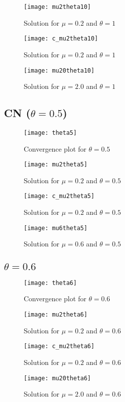 \documentclass{article}
\begin{document}
\begin{figure}[h!]
    \centering
    \texttt{[image: mu2theta10]}
    \caption{Solution for $\mu=0.2$ and $\theta=1$}
\end{figure}
\begin{figure}[h!]
    \centering
    \texttt{[image: c\_mu2theta10]}
    \caption{Solution for $\mu=0.2$ and $\theta=1$}
\end{figure}
\begin{figure}[h!]
    \centering
    \texttt{[image: mu20theta10]}
    \caption{Solution for $\mu=2.0$ and $\theta=1$}
\end{figure}

\clearpage
\subsection{CN ($\theta = 0.5$)}
\begin{figure}[h!]
    \centering
    \texttt{[image: theta5]}
    \caption{Convergence plot for $\theta=0.5$}
\end{figure}

\begin{figure}[h!]
    \centering
    \texttt{[image: mu2theta5]}
    \caption{Solution for $\mu=0.2$ and $\theta=0.5$}
\end{figure}
\begin{figure}[h!]
    \centering
    \texttt{[image: c\_mu2theta5]}
    \caption{Solution for $\mu=0.2$ and $\theta=0.5$}
\end{figure}
\begin{figure}[h!]
    \centering
    \texttt{[image: mu6theta5]}
    \caption{Solution for $\mu=0.6$ and $\theta=0.5$}
\end{figure}

\clearpage
\subsection{$\theta = 0.6$}
\begin{figure}[h!]
    \centering
    \texttt{[image: theta6]}
    \caption{Convergence plot for $\theta=0.6$}
\end{figure}

\begin{figure}[h!]
    \centering
    \texttt{[image: mu2theta6]}
    \caption{Solution for $\mu=0.2$ and $\theta=0.6$}
\end{figure}
\begin{figure}[h!]
    \centering
    \texttt{[image: c\_mu2theta6]}
    \caption{Solution for $\mu=0.2$ and $\theta=0.6$}
\end{figure}
\begin{figure}[h!]
    \centering
    \texttt{[image: mu20theta6]}
    \caption{Solution for $\mu=2.0$ and $\theta=0.6$}
\end{figure}
\end{document}
